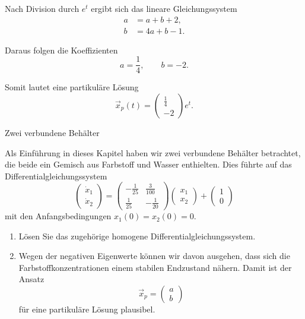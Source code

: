 Nach Division durch \(e^t\) ergibt sich das lineare Gleichungssystem
\[
    \begin{aligned}
        a & = a+b+2,  \\
        b & = 4a+b-1.
    \end{aligned}
\]

Daraus folgen die Koeffizienten
\[
    \boxed{a=\frac14,\qquad b=-2.}
\]

Somit lautet eine partikuläre Lösung
\[
    \boxed{
        \vec x_p(t)=
        \begin{pmatrix}
            \frac14 \\
            -2
        \end{pmatrix}e^t.
    }
\]
\clearpage
\begin{ueb}{Zwei verbundene Behälter}{}

    Als Einführung in dieses Kapitel haben wir zwei verbundene
    Behälter betrachtet, die beide ein Gemisch aus Farbstoff und
    Wasser enthielten. Dies führte auf das Differentialgleichungssystem
    \[
        \begin{pmatrix}
            \dot{x}_1 \\
            \dot{x}_2
        \end{pmatrix}
        =
        \begin{pmatrix}
            -\frac{1}{25} & \frac{3}{100} \\
            \frac{1}{25}  & -\frac{1}{20}
        \end{pmatrix}
        \begin{pmatrix}
            x_1 \\
            x_2
        \end{pmatrix}
        +
        \begin{pmatrix}
            1 \\
            0
        \end{pmatrix}
    \]
    mit den Anfangsbedingungen \(x_1(0)=x_2(0)=0\).

    \begin{enumerate}
        \item Lösen Sie das zugehörige homogene
              Differentialgleichungssystem.

        \item Wegen der negativen Eigenwerte können wir davon
              ausgehen, dass sich die Farbstoffkonzentrationen
              einem stabilen Endzustand nähern. Damit ist der
              Ansatz
              \[
                  \vec{x}_p=
                  \begin{pmatrix}
                      a \\
                      b
                  \end{pmatrix}
              \]
              für eine partikuläre Lösung plausibel.


\end{enumerate}
\end{ueb}
